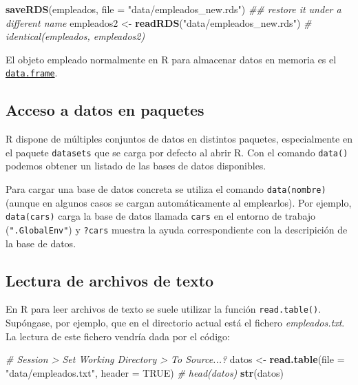 \documentclass[
]{book}
\newenvironment{Shaded}{\begin{snugshade}}{\end{snugshade}}
\newcommand{\CommentTok}[1]{\textcolor[rgb]{0.56,0.35,0.01}{\textit{#1}}}
\newcommand{\DataTypeTok}[1]{\textcolor[rgb]{0.13,0.29,0.53}{#1}}
\newcommand{\KeywordTok}[1]{\textcolor[rgb]{0.13,0.29,0.53}{\textbf{#1}}}
\newcommand{\NormalTok}[1]{#1}
\newcommand{\OtherTok}[1]{\textcolor[rgb]{0.56,0.35,0.01}{#1}}
\newcommand{\StringTok}[1]{\textcolor[rgb]{0.31,0.60,0.02}{#1}}
\begin{document}
\begin{Shaded}
\begin{Highlighting}[]
\KeywordTok{saveRDS}\NormalTok{(empleados, }\DataTypeTok{file =} \StringTok{"data/empleados_new.rds"}\NormalTok{)}
\CommentTok{## restore it under a different name}
\NormalTok{empleados2 <-}\StringTok{ }\KeywordTok{readRDS}\NormalTok{(}\StringTok{"data/empleados_new.rds"}\NormalTok{)}
\CommentTok{# identical(empleados, empleados2)}
\end{Highlighting}
\end{Shaded}

El objeto empleado normalmente en R para almacenar datos en memoria
es el \href{https://www.rdocumentation.org/packages/base/versions/3.6.1/topics/data.frame}{\texttt{data.frame}}.

\hypertarget{acceso-a-datos-en-paquetes}{%
\subsection{Acceso a datos en paquetes}\label{acceso-a-datos-en-paquetes}}

R dispone de múltiples conjuntos de datos en distintos paquetes, especialmente en el paquete \texttt{datasets}
que se carga por defecto al abrir R.
Con el comando \texttt{data()} podemos obtener un listado de las bases de datos disponibles.

Para cargar una base de datos concreta se utiliza el comando
\texttt{data(nombre)} (aunque en algunos casos se cargan automáticamente al emplearlos).
Por ejemplo, \texttt{data(cars)} carga la base de datos llamada \texttt{cars} en el entorno de trabajo (\texttt{".GlobalEnv"})
y \texttt{?cars} muestra la ayuda correspondiente con la descripición de la base de datos.

\hypertarget{cap2-texto}{%
\subsection{Lectura de archivos de texto}\label{cap2-texto}}

En R para leer archivos de texto se suele utilizar la función \texttt{read.table()}.
Supóngase, por ejemplo, que en el directorio actual está el fichero
\emph{empleados.txt}. La lectura de este fichero vendría dada por el código:

\begin{Shaded}
\begin{Highlighting}[]
\CommentTok{# Session > Set Working Directory > To Source...?}
\NormalTok{datos <-}\StringTok{ }\KeywordTok{read.table}\NormalTok{(}\DataTypeTok{file =} \StringTok{"data/empleados.txt"}\NormalTok{, }\DataTypeTok{header =} \OtherTok{TRUE}\NormalTok{)}
\CommentTok{# head(datos)}
\KeywordTok{str}\NormalTok{(datos)}
\end{Highlighting}
\end{Shaded}
\end{document}
